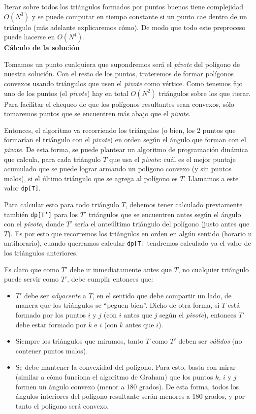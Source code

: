 Iterar sobre todos los triángulos formados por puntos buenos tiene complejidad 
$O(N^3)$ y se puede computar en tiempo constante si un punto cae dentro de un triángulo (más adelante 
explicaremos cómo). 
De modo que todo este preproceso puede hacerse en $O(N^4)$.\\

\textbf{Cálculo de la solución}

Tomamos un punto cualquiera que supondremos será el \textit{pivote} 
del polígono de nuestra solución. Con el resto de los puntos, trateremos de formar polígonos 
convexos usando triángulos que usen el \textit{pivote} como vértice. Como tenemos fijo uno 
de los puntos (el \textit{pivote}) hay en total $O(N^2)$ triángulos sobre los que iterar. 
Para facilitar el chequeo de que los polígonos resultantes sean convexos, 
sólo tomaremos puntos que se encuentren más abajo que el \textit{pivote}.

Entonces, el algoritmo va recorriendo los triángulos (o bien, los 2 puntos que formarían el triángulo 
con el \textit{pivote}) en orden según el ángulo que forman con el \textit{pivote}. De esta forma, 
se puede plantear un algoritmo de programación dinámica que calcula, para cada triángulo $T$ que 
usa el \textit{pivote}: cuál es el mejor puntaje acumulado que se puede lograr armando 
un polígono convexo (y sin puntos malos), si el último triángulo que se agrega al polígono 
es $T$. Llamamos a este valor \texttt{dp[T]}.

Para calcular esto para todo triángulo $T$, debemos tener calculado previamente también 
\texttt{dp[T']} para los $T'$ triángulos que se encuentren antes según el ángulo con el 
\textit{pivote}, donde $T'$ sería el anteúltimo triángulo del polígono (justo antes que $T$). 
Es por esto que recorremos los triángulos en orden en algún sentido (horario u 
antihorario), cuando querramos calcular \texttt{dp[T]} tendremos calculado ya el valor de los triángulos 
anteriores. 

Es claro que como $T'$ debe ir inmediatamente antes que $T$, no cualquier triángulo puede 
servir como $T'$, debe cumplir entonces que: 
\begin{itemize}
\item $T'$ debe ser \textit{adyacente} a $T$, en el sentido que debe compartir un lado, de manera 
que los triángulos se ``peguen bien''. Dicho de otra forma, si $T$ está formado por los puntos $i$ y $j$ 
(con $i$ antes que $j$ según el \textit{pivote}), entonces $T'$ debe estar formado por $k$ e $i$ 
(con $k$ antes que $i$). 
\item Siempre los triángulos que miramos, tanto $T$ como $T'$ deben ser \textit{válidos} (no 
contener puntos malos). 
\item Se debe mantener la convexidad del polígono. Para esto, basta con mirar (similar a cómo 
funciona el algoritmo de Graham) que los puntos $k$, $i$ y $j$ formen un ángulo convexo (menor a 180 grados). 
De esta forma, todos los ángulos interiores del polígono resultante serán menores a 180 grados, y 
por tanto el polígono será convexo. 
\end{itemize}

